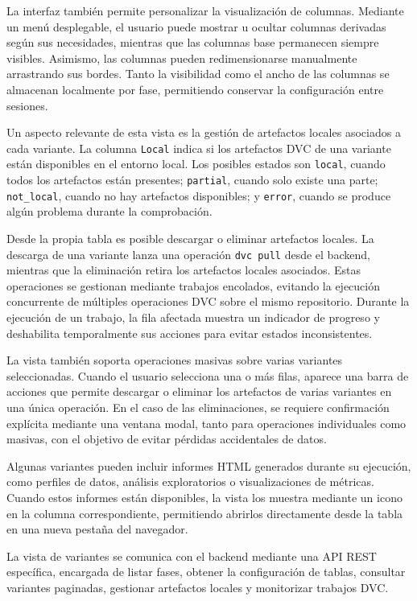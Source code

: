 La interfaz también permite personalizar la visualización de columnas. Mediante un menú desplegable, el usuario puede mostrar u ocultar columnas derivadas según sus necesidades, mientras que las columnas base permanecen siempre visibles. Asimismo, las columnas pueden redimensionarse manualmente arrastrando sus bordes. Tanto la visibilidad como el ancho de las columnas se almacenan localmente por fase, permitiendo conservar la configuración entre sesiones.

Un aspecto relevante de esta vista es la gestión de artefactos locales asociados a cada variante. La columna \texttt{Local} indica si los artefactos DVC de una variante están disponibles en el entorno local. Los posibles estados son \texttt{local}, cuando todos los artefactos están presentes; \texttt{partial}, cuando solo existe una parte; \texttt{not\_local}, cuando no hay artefactos disponibles; y \texttt{error}, cuando se produce algún problema durante la comprobación.

Desde la propia tabla es posible descargar o eliminar artefactos locales. La descarga de una variante lanza una operación \texttt{dvc pull} desde el backend, mientras que la eliminación retira los artefactos locales asociados. Estas operaciones se gestionan mediante trabajos encolados, evitando la ejecución concurrente de múltiples operaciones DVC sobre el mismo repositorio. Durante la ejecución de un trabajo, la fila afectada muestra un indicador de progreso y deshabilita temporalmente sus acciones para evitar estados inconsistentes.

La vista también soporta operaciones masivas sobre varias variantes seleccionadas. Cuando el usuario selecciona una o más filas, aparece una barra de acciones que permite descargar o eliminar los artefactos de varias variantes en una única operación. En el caso de las eliminaciones, se requiere confirmación explícita mediante una ventana modal, tanto para operaciones individuales como masivas, con el objetivo de evitar pérdidas accidentales de datos.

Algunas variantes pueden incluir informes HTML generados durante su ejecución, como perfiles de datos, análisis exploratorios o visualizaciones de métricas. Cuando estos informes están disponibles, la vista los muestra mediante un icono en la columna correspondiente, permitiendo abrirlos directamente desde la tabla en una nueva pestaña del navegador.

La vista de variantes se comunica con el backend mediante una API REST específica, encargada de listar fases, obtener la configuración de tablas, consultar variantes paginadas, gestionar artefactos locales y monitorizar trabajos DVC.

